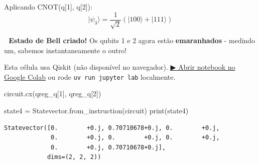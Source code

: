 \documentclass[
  brazilian,
]{report}
\newenvironment{Shaded}{\begin{snugshade}}{\end{snugshade}}
\newcommand{\BuiltInTok}[1]{\textcolor[rgb]{0.00,0.23,0.31}{#1}}
\newcommand{\DecValTok}[1]{\textcolor[rgb]{0.68,0.00,0.00}{#1}}
\newcommand{\NormalTok}[1]{\textcolor[rgb]{0.00,0.23,0.31}{#1}}
\newcommand{\OperatorTok}[1]{\textcolor[rgb]{0.37,0.37,0.37}{#1}}
\begin{document}
Aplicando CNOT(q{[}1{]}, q{[}2{]}):
\[|\psi_3\rangle = \frac{1}{\sqrt{2}}(|100\rangle + |111\rangle)\]

\textbf{🔗 Estado de Bell criado!} Os qubits 1 e 2 agora estão
\textbf{emaranhados} - medindo um, sabemos instantaneamente o outro!

\begin{tcolorbox}[enhanced jigsaw, arc=.35mm, bottomrule=.15mm, bottomtitle=1mm, breakable, colback=white, colbacktitle=quarto-callout-warning-color!10!white, colframe=quarto-callout-warning-color-frame, coltitle=black, left=2mm, leftrule=.75mm, opacityback=0, opacitybacktitle=0.6, rightrule=.15mm, title=\textcolor{quarto-callout-warning-color}{\faExclamationTriangle}\hspace{0.5em}{⚛️ Célula Qiskit --- execute no Colab ou localmente}, titlerule=0mm, toprule=.15mm, toptitle=1mm]

Esta célula usa Qiskit (não disponível no navegador).
\href{https://colab.research.google.com/github/maxwellamaral/aula-quantum/blob/main/notebooks/02-teletransport.ipynb}{▶
Abrir notebook no Google Colab} ou rode \texttt{uv\ run\ jupyter\ lab}
localmente.

\begin{Shaded}
\begin{Highlighting}[]

\NormalTok{circuit.cx(qreg\_q[}\DecValTok{1}\NormalTok{], qreg\_q[}\DecValTok{2}\NormalTok{])}

\NormalTok{state4 }\OperatorTok{=}\NormalTok{ Statevector.from\_instruction(circuit)}
\BuiltInTok{print}\NormalTok{(state4)}
\end{Highlighting}
\end{Shaded}

\end{tcolorbox}

\begin{verbatim}
Statevector([0.        +0.j, 0.70710678+0.j, 0.        +0.j,
             0.        +0.j, 0.        +0.j, 0.        +0.j,
             0.        +0.j, 0.70710678+0.j],
            dims=(2, 2, 2))
\end{verbatim}
\end{document}
